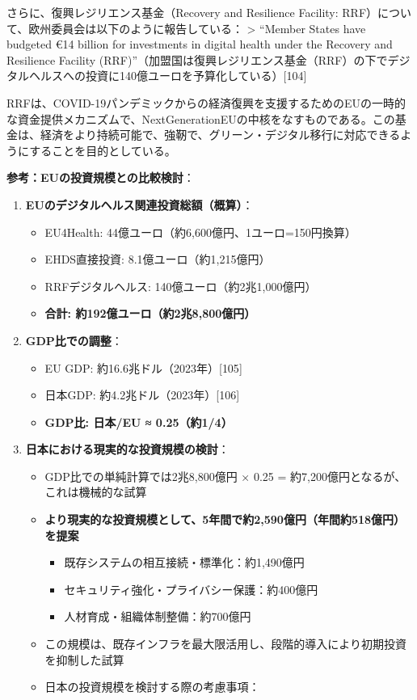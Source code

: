 \documentclass[
  a4paper,
  a4paper,
  11pt]{ltjsbook}
\providecommand{\tightlist}{%
  \setlength{\itemsep}{0pt}\setlength{\parskip}{0pt}}
\begin{document}
さらに、復興レジリエンス基金（Recovery and Resilience Facility:
RRF）について、欧州委員会は以下のように報告している： \textgreater{}
``Member States have budgeted €14 billion for investments in digital
health under the Recovery and Resilience Facility
(RRF)''（加盟国は復興レジリエンス基金（RRF）の下でデジタルヘルスへの投資に140億ユーロを予算化している）{[}104{]}

RRFは、COVID-19パンデミックからの経済復興を支援するためのEUの一時的な資金提供メカニズムで、NextGenerationEUの中核をなすものである。この基金は、経済をより持続可能で、強靭で、グリーン・デジタル移行に対応できるようにすることを目的としている。

\textbf{参考：EUの投資規模との比較検討}：

\begin{enumerate}
\def\labelenumi{\arabic{enumi}.}
\tightlist
\item
  \textbf{EUのデジタルヘルス関連投資総額（概算）}：

  \begin{itemize}
  \tightlist
  \item
    EU4Health: 44億ユーロ（約6,600億円、1ユーロ=150円換算）
  \item
    EHDS直接投資: 8.1億ユーロ（約1,215億円）
  \item
    RRFデジタルヘルス: 140億ユーロ（約2兆1,000億円）
  \item
    \textbf{合計: 約192億ユーロ（約2兆8,800億円）}
  \end{itemize}
\item
  \textbf{GDP比での調整}：

  \begin{itemize}
  \tightlist
  \item
    EU GDP: 約16.6兆ドル（2023年）{[}105{]}
  \item
    日本GDP: 約4.2兆ドル（2023年）{[}106{]}
  \item
    \textbf{GDP比: 日本/EU ≈ 0.25（約1/4）}
  \end{itemize}
\item
  \textbf{日本における現実的な投資規模の検討}：

  \begin{itemize}
  \tightlist
  \item
    GDP比での単純計算では2兆8,800億円 × 0.25 =
    約7,200億円となるが、これは機械的な試算
  \item
    \textbf{より現実的な投資規模として、5年間で約2,590億円（年間約518億円）を提案}

    \begin{itemize}
    \tightlist
    \item
      既存システムの相互接続・標準化：約1,490億円
    \item
      セキュリティ強化・プライバシー保護：約400億円\\
    \item
      人材育成・組織体制整備：約700億円
    \end{itemize}
  \item
    この規模は、既存インフラを最大限活用し、段階的導入により初期投資を抑制した試算
  \item
    日本の投資規模を検討する際の考慮事項：


\end{itemize}
\end{enumerate}
\end{document}
